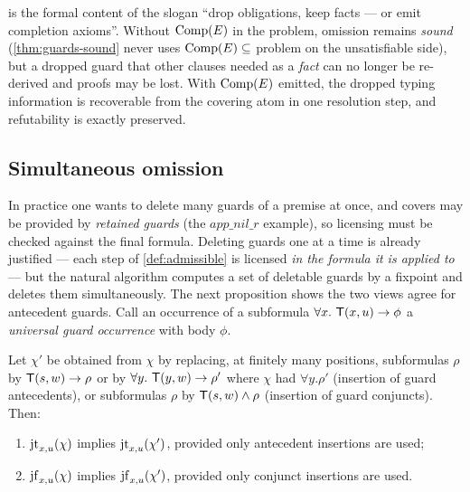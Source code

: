 \begin{remark}
   is the formal content of the slogan ``drop
  obligations, keep facts --- or emit completion axioms''.  Without
  $\mathrm{Comp}(E)$ in the problem, omission remains \emph{sound}
  (\cref{thm:guards-sound} never uses $\mathrm{Comp}(E) \subseteq$ problem on the
  unsatisfiable side), but a dropped guard that other clauses needed as a
  \emph{fact} can no longer be re-derived and proofs may be lost.  With
  $\mathrm{Comp}(E)$ emitted, the dropped typing information is recoverable from the
  covering atom in one resolution step, and refutability is exactly
  preserved.
\end{remark}

\subsection{Simultaneous omission}

In practice one wants to delete many guards of a premise at once, and
covers may be provided by \emph{retained guards} (the
$\mathit{app\_nil\_r}$ example), so licensing must be checked against the
final formula.  Deleting guards one at a time is already justified ---
each step of \cref{def:admissible} is licensed \emph{in the formula it is
applied to} --- but the natural algorithm computes a set of deletable
guards by a fixpoint and deletes them simultaneously.  The next
proposition shows the two views agree for antecedent guards.  Call an
occurrence of a subformula $\forall x.\ \mathsf{T}(x,u) \rightarrow \phi$ a
\emph{universal guard occurrence} with body $\phi$.

\begin{lemma}[Expansion]
  \label{lem:expansion}
  Let $\chi'$ be obtained from $\chi$ by replacing, at finitely many
  positions, subformulas $\rho$ by $\mathsf{T}(s,w) \rightarrow \rho$ or by
  $\forall y.\ \mathsf{T}(y,w) \rightarrow \rho'$ where $\chi$ had $\forall y.\rho'$
  (insertion of guard antecedents), or subformulas $\rho$ by
  $\mathsf{T}(s,w) \wedge \rho$ (insertion of guard conjuncts).  Then:
  \begin{enumerate}[label=(\roman*)]
  \item $\mathrm{jt}_{x,u}(\chi)$ implies $\mathrm{jt}_{x,u}(\chi')$, provided only
    antecedent insertions are used;
  \item $\mathrm{jf}_{x,u}(\chi)$ implies $\mathrm{jf}_{x,u}(\chi')$, provided only
    conjunct insertions are used.
  \end{enumerate}
\end{lemma}

